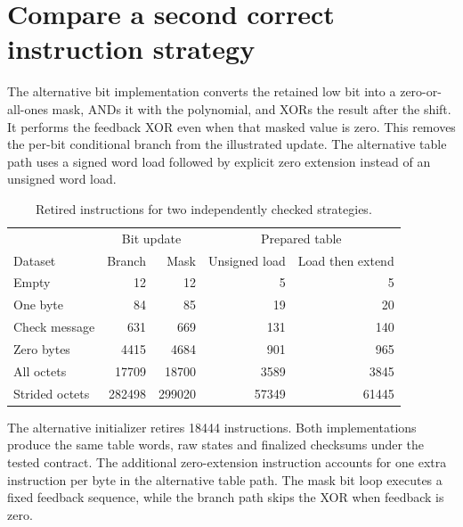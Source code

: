 \section{Compare a second correct instruction strategy}
The alternative bit implementation converts the retained low bit into a zero-or-all-ones
mask, ANDs it with the polynomial, and XORs the result after the shift. It performs the
feedback XOR even when that masked value is zero. This removes the per-bit conditional
branch from the illustrated update. The alternative table path uses a signed word load
followed by explicit zero extension instead of an unsigned word load.

\begin{table}[htbp]
  \centering
  \caption{Retired instructions for two independently checked strategies.}
  \begin{tabular}{lrrrr}
    \toprule
                   & \multicolumn{2}{c}{Bit update} & \multicolumn{2}{c}{Prepared table}                                    \\
    Dataset        & Branch                         & Mask                               & Unsigned load & Load then extend \\
    \midrule
    Empty          & 12                             & 12                                 & 5             & 5                \\
    One byte       & 84                             & 85                                 & 19            & 20               \\
    Check message  & 631                            & 669                                & 131           & 140              \\
    Zero bytes     & 4415                           & 4684                               & 901           & 965              \\
    All octets     & 17709                          & 18700                              & 3589          & 3845             \\
    Strided octets & 282498                         & 299020                             & 57349         & 61445            \\
    \bottomrule
  \end{tabular}
\end{table}

The alternative initializer retires 18444 instructions. Both implementations produce
the same table words, raw states and finalized checksums under the tested contract.
The additional zero-extension instruction accounts for one extra instruction per byte
in the alternative table path. The mask bit loop executes a fixed feedback sequence,
while the branch path skips the XOR when feedback is zero.


